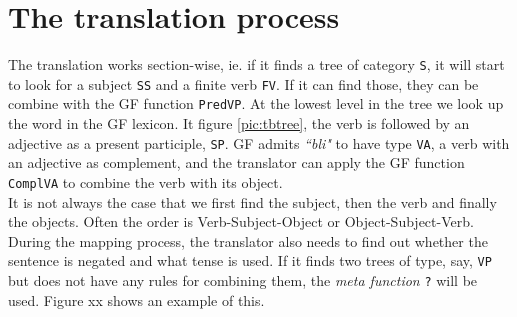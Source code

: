 \documentclass{report}
\begin{document}
\section{The translation process}
The translation works section-wise, ie. if it finds a tree of category \verb|S|,
it will start to look for a subject \verb|SS| and a finite verb \verb|FV|. If it
can find those, they can be combine with the GF function \verb|PredVP|.
At the lowest level in the tree we look up the word in the GF lexicon.
It figure \ref{pic:tbtree}, the verb is followed by an adjective as a present
participle, \verb|SP|. GF admits \emph{``bli"} to have type \verb|VA|, a verb
with an adjective as complement, and the translator can apply the GF function
\verb|ComplVA| to combine the verb with its object. \\
It is not always the case that we first find the subject, then the verb and 
finally the objects. Often the order is Verb-Subject-Object or Object-Subject-Verb. \\
During the mapping process, the translator also needs to find out whether the sentence is
negated and what tense is used. If it finds two trees of type, say, \verb|VP| but does not
have any rules for combining them, the \textit{meta function} \verb-?- will be used. 
Figure xx shows an example of this.\\


\end{document}
